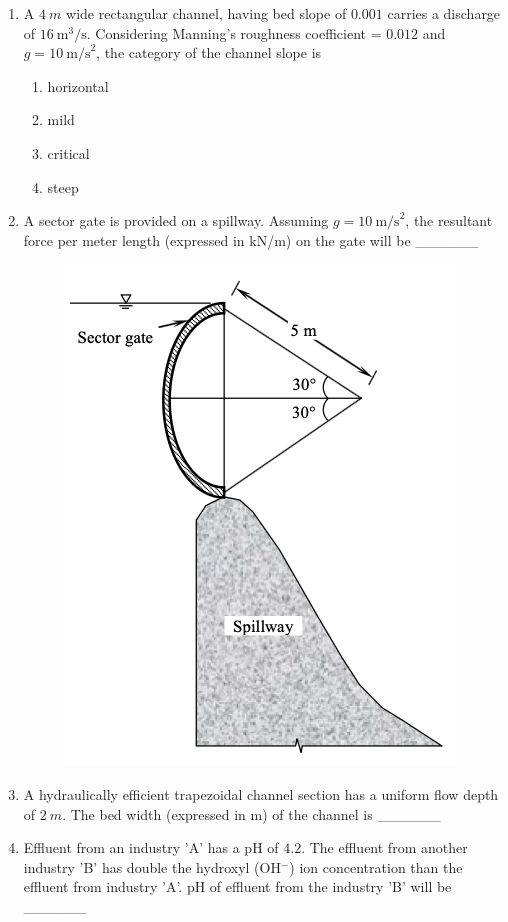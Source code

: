 \documentclass[journal]{IEEEtran}
\begin{document}
\begin{enumerate}[resume]
\item A $4 \ m$ wide rectangular channel, having bed slope of $0.001$ carries a discharge of $16 \ \text{m}^3/\text{s}$. Considering Manning's roughness coefficient = $0.012$ and $g = 10 \ \text{m/s}^2$, the category of the channel slope is  \hfill {}


\begin{enumerate}
    \item horizontal
    \item mild
    \item critical
    \item steep
\end{enumerate}

\item A sector gate is provided on a spillway. Assuming $g = 10 \ \text{m/s}^2$, the resultant force per meter length (expressed in kN/m) on the gate will be \_\_\_\_\_\_ \hfill {}

\begin{figure}[H]
    \centering
    \includegraphics[width=0.6\columnwidth]{figs/Q58.png} 
    \caption{}
    \label{fig:placeholder}
\end{figure}

\item A hydraulically efficient trapezoidal channel section has a uniform flow depth of $2 \ m$. The bed width (expressed in m) of the channel is \_\_\_\_\_\_ \hfill {}

\item Effluent from an industry 'A' has a pH of $4.2$. The effluent from another industry 'B' has double the hydroxyl (OH$^-$) ion concentration than the effluent from industry 'A'. pH of effluent from the industry 'B' will be \_\_\_\_\_\_ \hfill {}


\end{enumerate}
\end{document}
